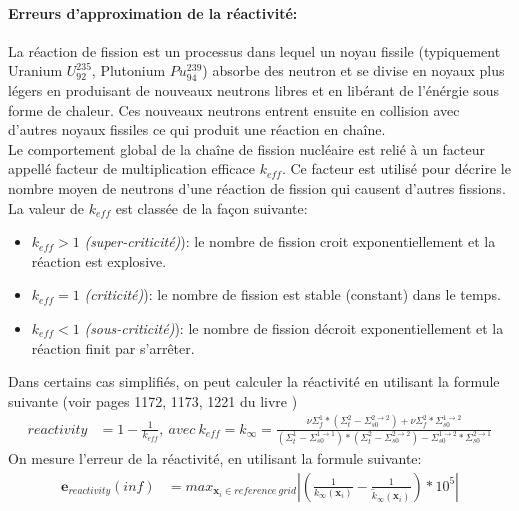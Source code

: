 \paragraph{Erreurs d'approximation de la réactivité:\\}
\hspace{0.5cm} La réaction de fission est un processus dans lequel un noyau fissile (typiquement Uranium $U_{92}^{235}$, Plutonium $Pu_{94}^239$) absorbe
des neutron et se divise en noyaux plus légers en produisant de nouveaux neutrons libres et en libérant de l'énérgie sous forme de chaleur.
Ces nouveaux neutrons entrent ensuite en collision avec d'autres noyaux fissiles ce qui produit une réaction en chaîne.\\
\hspace{0.5cm} Le comportement global de la chaîne de fission nucléaire est relié à un facteur appellé facteur de multiplication efficace $k_{eff}$.
Ce facteur est utilisé pour décrire le nombre moyen de neutrons d'une réaction de fission qui causent d'autres fissions.\\
La valeur de $k_{eff}$ est classée de la façon suivante:
\begin{itemize}
\item $k_{eff} > 1$ \textit{(super-criticité)}): le nombre de fission croit exponentiellement et la
réaction est explosive.
\item $k_{eff} = 1$ \textit{(criticité)}): le nombre de fission est stable (constant) dans le temps.
\item $k_{eff} < 1$ \textit{(sous-criticité)}): le nombre de fission décroit exponentiellement et la
réaction finit par s'arrêter.
\end{itemize}
Dans certains cas simplifiés, on peut calculer la réactivité en utilisant la formule suivante (voir pages 1172, 1173, 1221 du livre \cite{Marguet})
\begin{align}
		reactivity & = 1-\frac{1}{k_{eff}},\ avec\ k_{eff} = k_{\infty}=\frac{\nu\Sigma_f^1 * (\Sigma_t^2-\Sigma_{s0}^{2\rightarrow2}) + \nu\Sigma_f^2*\Sigma_{s0}^{1\rightarrow2}}{(\Sigma_t^1-\Sigma_{s0}^{1\rightarrow1})*(\Sigma_t^2-\Sigma_{s0}^{2\rightarrow2})-\Sigma_{s0}^{1\rightarrow2}*\Sigma_{s0}^{2\rightarrow1}} \nonumber
\end{align}
On mesure l'erreur de la réactivité, en utilisant la formule suivante:
\begin{align}
		\textbf{e}_{reactivity}{(inf)} & = max_{\textbf{x}_i \in reference\ grid} \left | (\frac{1}{k_{\infty}(\textbf{x}_i)} - \frac{1}{\tilde{k}_{\infty}(\textbf{x}_i)})*10^5 \right | \nonumber
\end{align}


